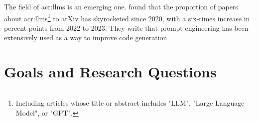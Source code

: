 The field of \glspl{acr:llm} is an emerging one. \cite[2]{fanLargeLanguageModels2023} found that the proportion of papers about \glspl{acr:llm}\footnote{Including articles whose title or abstract includes "LLM", "Large Language Model", or "GPT".} to arXiv has skyrocketed since 2020, with a six-times increase in percent points from 2022 to 2023. They write that prompt engineering has been extensively used as a way to improve code generation \citep[7]{fanLargeLanguageModels2023}

\section{Goals and Research Questions}\label{sec:goals-and-research-questions}
\label{sec:GoalsandResearchQuestions}

